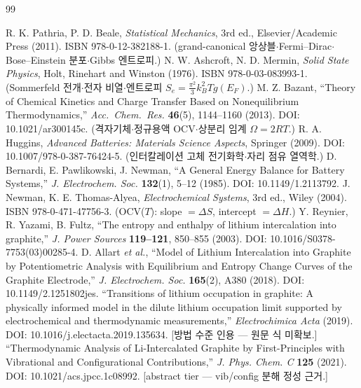 \documentclass[11pt,a4paper]{article}
\begin{document}
\begin{thebibliography}{99}
 R. K. Pathria, P. D. Beale, \emph{Statistical Mechanics}, 3rd ed., Elsevier/Academic Press (2011). ISBN 978-0-12-382188-1. (grand-canonical 앙상블$\cdot$Fermi--Dirac$\cdot$Bose--Einstein 분포$\cdot$Gibbs 엔트로피.)
 N. W. Ashcroft, N. D. Mermin, \emph{Solid State Physics}, Holt, Rinehart and Winston (1976). ISBN 978-0-03-083993-1. (Sommerfeld 전개$\cdot$전자 비열$\cdot$엔트로피 $S_e=\tfrac{\pi^2}{3}k_B^2 T g(E_F)$.)
 M. Z. Bazant, ``Theory of Chemical Kinetics and Charge Transfer Based on Nonequilibrium Thermodynamics,'' \emph{Acc.\ Chem.\ Res.} \textbf{46}(5), 1144--1160 (2013). DOI: 10.1021/ar300145c. (격자기체$\cdot$정규용액 OCV$\cdot$상분리 임계 $\Omega=2RT$.)
 R. A. Huggins, \emph{Advanced Batteries: Materials Science Aspects}, Springer (2009). DOI: 10.1007/978-0-387-76424-5. (인터칼레이션 고체 전기화학$\cdot$자리 점유 열역학.)
 D. Bernardi, E. Pawlikowski, J. Newman, ``A General Energy Balance for Battery Systems,'' \emph{J. Electrochem. Soc.} \textbf{132}(1), 5--12 (1985). DOI: 10.1149/1.2113792.
 J. Newman, K. E. Thomas-Alyea, \emph{Electrochemical Systems}, 3rd ed., Wiley (2004). ISBN 978-0-471-47756-3. (OCV($T$): slope $=\Delta S$, intercept $=\Delta H$.)
 Y. Reynier, R. Yazami, B. Fultz, ``The entropy and enthalpy of lithium intercalation into graphite,'' \emph{J. Power Sources} \textbf{119--121}, 850--855 (2003). DOI: 10.1016/S0378-7753(03)00285-4.
 D. Allart \emph{et al.}, ``Model of Lithium Intercalation into Graphite by Potentiometric Analysis with Equilibrium and Entropy Change Curves of the Graphite Electrode,'' \emph{J. Electrochem. Soc.} \textbf{165}(2), A380 (2018). DOI: 10.1149/2.1251802jes.
 ``Transitions of lithium occupation in graphite: A physically informed model in the dilute lithium occupation limit supported by electrochemical and thermodynamic measurements,'' \emph{Electrochimica Acta} (2019). DOI: 10.1016/j.electacta.2019.135634. [방법 수준 인용 — 원문 식 미확보.]
 ``Thermodynamic Analysis of Li-Intercalated Graphite by First-Principles with Vibrational and Configurational Contributions,'' \emph{J. Phys. Chem. C} \textbf{125} (2021). DOI: 10.1021/acs.jpcc.1c08992. [abstract tier — vib/config 분해 정성 근거.]

\end{thebibliography}
\end{document}
